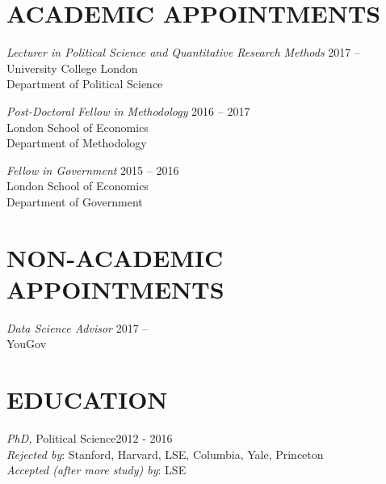 \documentclass[centered]{res}
\begin{document}
 
\address{Department of Political Science \\ University College London\\ Gower Street \\ London \\ WC1E 6BT }

\address{\faEnvelope \hfil \textcolor{white}{hi}\href{mailto:j.blumenau@ucl.ac.uk}{j.blumenau@ucl.ac.uk} \\ \faHome \hfil\href{http://www.jackblumenau.com}{jackblumenau.com}\\ \faTwitter \hfil \href{http://www.twitter.com/jblumenau}{@jblumenau}}

 
\begin{resume}

\section{ACADEMIC APPOINTMENTS} 
{\sl Lecturer in Political Science and Quantitative Research Methods} \hfill 2017 --\\
University College London\\
Department of Political Science

{\sl Post-Doctoral Fellow in Methodology} \hfill 2016 -- 2017\\
London School of Economics\\
Department of Methodology

{\sl Fellow in Government} \hfill 2015 -- 2016\\
London School of Economics\\
Department of Government

\section{NON-ACADEMIC APPOINTMENTS}

{\sl Data Science Advisor} \hfill 2017 --\\
YouGov


\section{EDUCATION} 

		{\sl PhD,} Political Science\hfill 2012 - 2016\\
		\emph{Rejected by}: Stanford, Harvard, LSE, Columbia, Yale, Princeton\\
                \emph{Accepted (after more study) by}: LSE


\end{resume}
\end{document}

